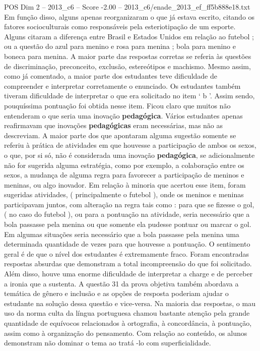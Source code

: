 \begin{textsample}{POS Dim 2 – 2013\_c6 – Score -2.00 – 2013\_c6/enade\_2013\_ef\_ff5b888e18.txt}
Em função disso, alguns apenas reorganizaram o que já estava escrito, citando os fatores socioculturais como responsáveis pela esteriotipação de um esporte.
Alguns citaram a diferença entre Brasil e Estados Unidos em relação ao futebol ; ou a questão do azul para menino e rosa para menina ; bola para menino e boneca para menina.
A maior parte das respostas corretas se referia às questões de discriminação, preconceito, exclusão, estereótipos e machismo.
Mesmo assim, como já comentado, a maior parte dos estudantes teve dificuldade de compreender e interpretar corretamente o enunciado.
Os estudantes também tiveram dificuldade de interpretar o que era solicitado no item ‘ b ’.
Assim sendo, pouquíssima pontuação foi obtida nesse item.
Ficou claro que muitos não entenderam o que seria uma inovação \textbf{pedagógica}.
Vários estudantes apenas reafirmavam que inovações \textbf{pedagógicas} eram necessárias, mas não as descreviam.
A maior parte dos que apontaram alguma sugestão somente se referiu à prática de atividades em que houvesse a participação de ambos os sexos, o que, por si só, não é considerada uma inovação \textbf{pedagógica}, se adicionalmente não for sugerida alguma estratégia, como por exemplo, a colaboração entre os sexos, a mudança de alguma regra para favorecer a participação de meninos e meninas, ou algo inovador.
Em relação à minoria que acertou esse item, foram sugeridas atividades, ( principalmente o futebol ), onde os meninos e meninas participavam juntos, com alteração na regra tais como : para que se fizesse o gol, ( no caso do futebol ), ou para a pontuação na atividade, seria necessário que a bola passasse pela menina ou que somente ela pudesse pontuar ou marcar o gol.
Em algumas situações seria necessário que a bola passasse pela menina uma determinada quantidade de vezes para que houvesse a pontuação.
O sentimento geral é de que o nível dos estudantes é extremamente fraco.
Foram encontradas respostas absurdas que demonstram a total incompreensão do que foi solicitado.
Além disso, houve uma enorme dificuldade de interpretar a charge e de perceber a ironia que a sustenta.
A questão 31 da prova objetiva também abordava a temática de gênero e inclusão e as opções de resposta poderiam ajudar o estudante na solução dessa questão e vice-versa.
Na maioria das respostas, o mau uso da norma culta da língua portuguesa chamou bastante atenção pela grande quantidade de equívocos relacionados à ortografia, à concordância, à pontuação, assim como à organização do pensamento.
Com relação ao conteúdo, os alunos demonstram não dominar o tema ao tratá -lo com superficialidade.

\end{textsample}
